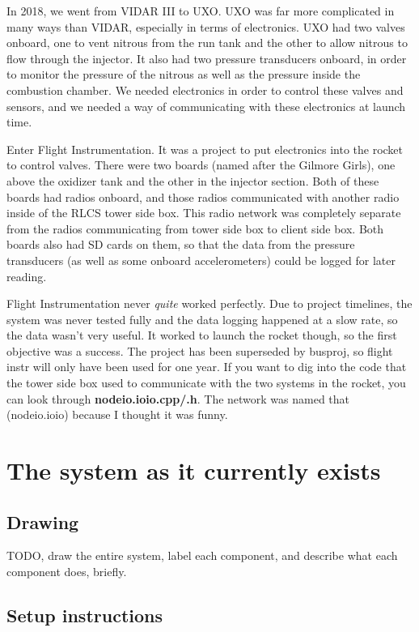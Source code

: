 \documentclass[11pt]{article}
\begin{document}
In 2018, we went from VIDAR III to UXO. UXO was far more complicated in many
ways than VIDAR, especially in terms of electronics. UXO had two valves onboard,
one to vent nitrous from the run tank and the other to allow nitrous to flow
through the injector. It also had two pressure transducers onboard, in order to
monitor the pressure of the nitrous as well as the pressure inside the
combustion chamber. We needed electronics in order to control these valves and
sensors, and we needed a way of communicating with these electronics at launch
time.

Enter Flight Instrumentation. It was a project to put electronics into the
rocket to control valves. There were two boards (named after the Gilmore Girls),
one above the oxidizer tank and the other in the injector section. Both of these
boards had radios onboard, and those radios communicated with another radio
inside of the RLCS tower side box. This radio network was completely separate
from the radios communicating from tower side box to client side box. Both
boards also had SD cards on them, so that the data from the pressure transducers
(as well as some onboard accelerometers) could be logged for later reading.

Flight Instrumentation never \emph{quite} worked perfectly. Due to project timelines,
the system was never tested fully and the data logging happened at a slow rate,
so the data wasn't very useful. It worked to launch the rocket though, so the
first objective was a success. The project has been superseded by busproj, so
flight instr will only have been used for one year. If you want to dig into the
code that the tower side box used to communicate with the two systems in the
rocket, you can look through \textbf{nodeio.ioio.cpp/.h}. The network was named that
(nodeio.ioio) because I thought it was funny.

\section{The system as it currently exists}
\label{sec:orgfaa273c}

\subsection{Drawing}
\label{sec:orgc78e79c}

TODO, draw the entire system, label each component, and describe what each
component does, briefly.

\subsection{Setup instructions}
\label{sec:org07f2591}
\end{document}
